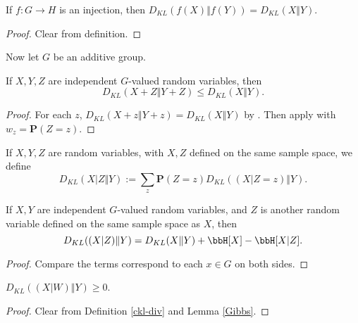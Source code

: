\begin{lemma}\label{kl-div-inj}\leanok  If $f:G \to H$ is an injection, then $D_{KL}(f(X)\Vert f(Y)) = D_{KL}(X\Vert Y)$.
\end{lemma}

\begin{proof} Clear from definition.
\end{proof}

Now let $G$ be an additive group.

\begin{lemma}\label{kl-sums}\leanok If $X, Y, Z$ are independent $G$-valued random variables, then
  $$D_{KL}(X+Z\Vert Y+Z) \leq D_{KL}(X\Vert Y).$$
\end{lemma}

\begin{proof}
For each $z$, $D_{KL}(X+z\Vert Y+z)=D_{KL}(X\Vert Y)$ by . Then apply  with $w_z=\mathbf{P}(Z=z)$.
\end{proof}

\begin{definition}\label{ckl-div}  
  If $X,Y,Z$ are random variables, with $X,Z$ defined on the same sample space, we define
$$ D_{KL}(X|Z \Vert  Y) := \sum_z \mathbf{P}(Z=z) D_{KL}( (X|Z=z) \Vert  Y).$$
\end{definition}

\begin{lemma}\label{kl-cond} If $X, Y$ are independent $G$-valued random variables, and $Z$ is another random variable defined on the same sample space as $X$, then
  $$D_{KL}((X|Z)\Vert Y) = D_{KL}(X\Vert Y) + \bbH[X] - \bbH[X|Z].$$
\end{lemma}

\begin{proof}
   Compare the terms correspond to each $x\in G$ on both sides.
\end{proof}

\begin{lemma}\label{Conditional-Gibbs}  $D_{KL}((X|W)\Vert Y) \geq 0$.
\end{lemma}

\begin{proof}  Clear from Definition \ref{ckl-div} and Lemma \ref{Gibbs}.
\end{proof}


